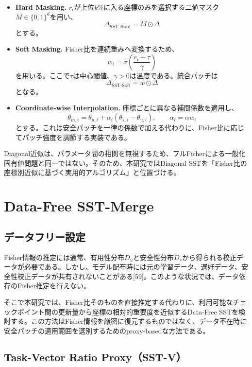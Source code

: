 \begin{itemize}
\item \textbf{Hard Masking.}
  \(r_i\)が上位\(k\%\)に入る座標のみを選択する二値マスク\(M\in\{0,1\}^d\)を用い、
  \[
  \Delta_{\mathrm{SST\text{-}Hard}}
  =
  M\odot\Delta
  \]
  とする。

\item \textbf{Soft Masking.}
  Fisher比を連続重みへ変換するため、
  \[
  w_i
  =
  \sigma\left(
  \frac{r_i-\tau}{\gamma}
  \right)
  \]
  を用いる。ここで\(\tau\)は中心閾値、\(\gamma>0\)は温度である。統合パッチは
  \[
  \Delta_{\mathrm{SST\text{-}Soft}}
  =
  w\odot\Delta
  \]
  となる。

\item \textbf{Coordinate-wise Interpolation.}
  座標ごとに異なる補間係数を適用し、
  \[
  \theta_{m,i}
  =
  \theta_{u,i}
  +
  \alpha_i(\theta_{s,i}-\theta_{u,i}),
  \qquad
  \alpha_i=\alpha w_i
  \]
  とする。これは安全パッチを一律の係数で加える代わりに、Fisher比に応じてパッチ強度を調節する実装である。
\end{itemize}

Diagonal近似は、パラメータ間の相関を無視するため、フルFisherによる一般化固有値問題と同一ではない。そのため、本研究ではDiagonal SSTを「Fisher比の座標別近似に基づく実用的アルゴリズム」と位置づける。

\section{Data-Free SST-Merge}
\label{app:data-free-sst}

\subsection{データフリー設定}

Fisher情報の推定には通常、有用性分布\(D_u\)と安全性分布\(D_s\)から得られる校正データが必要である。しかし、モデル配布時には元の学習データ、選好データ、安全性校正データが共有されないことがある[59]。このような状況では、データ依存のFisher推定を行えない。

そこで本研究では、Fisher比そのものを直接推定する代わりに、利用可能なチェックポイント間の更新量から座標の相対的重要度を近似するData-Free SSTを検討する。この方法はFisher情報を厳密に復元するものではなく、データ不在時に安全パッチの適用範囲を選別するためのproxy-basedな方法である。

\subsection{Task-Vector Ratio Proxy（SST-V）}

